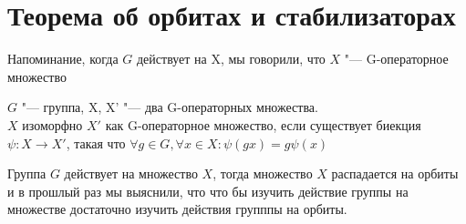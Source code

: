 ﻿\section{Теорема об орбитах и стабилизаторах}
Напоминание, когда $G$ действует на X, мы говорили, что $X$ "--- G-операторное множество\\
\begin{Def}
$G$ "--- группа, X, X' "--- два G-операторных множества.\\
$X$ изоморфно $X'$ как G-операторное множество, если 
существует биекция $\psi \colon X \to X'$, такая что
$\forall g \in G, \forall x \in X \colon \psi(gx) = g \psi(x)$\\
\end{Def}

Группа $G$ действует на множество $X$, тогда множество $X$ распадается на орбиты и 
в прошлый раз мы выяснили, что что бы изучить действие группы на множестве достаточно изучить
действия групппы на орбиты. 

